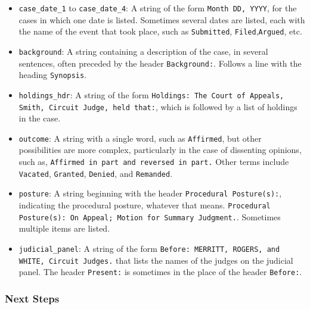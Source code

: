 \documentclass[11pt]{paper}
\begin{document}
\begin{itemize}
	\item \texttt{case\_date\_1} to \texttt{case\_date\_4}: A string of the form 
		\texttt{Month DD, YYYY}, for the cases in which one date is listed. 
		Sometimes several dates are listed, 
		each with the name of the event that took place, 
		such as \texttt{Submitted}, \texttt{Filed},\texttt{Argued}, etc. 

	\item \texttt{background}: A string containing a description of the case, 
		in several sentences, 
		often preceded by the header \texttt{Background:}. 
		Follows a line with the heading \texttt{Synopsis}. 

	\item \texttt{holdings\_hdr}: A string of the form 
		\texttt{Holdings: The Court of Appeals, Smith, Circuit Judge, held that:},
		which is followed by a list of holdings in the case. 

	\item \texttt{outcome}: A string with a single word, 
		such as \texttt{Affirmed}, 
		but other possibilities are more complex, 
		particularly in the case of dissenting opinions, 
		such as, \texttt{Affirmed in part and reversed in part.}
		Other terms include \texttt{Vacated}, \texttt{Granted}, 
		\texttt{Denied}, and \texttt{Remanded}. 

	\item \texttt{posture}: A string beginning with the header 
		\texttt{Procedural Posture(s):}, indicating the procedural posture, 
		whatever that means. 
		\texttt{Procedural Posture(s): On Appeal; Motion for Summary Judgment.}. 
		Sometimes multiple items are listed. 

	\item \texttt{judicial\_panel}: A string of the form 
		\texttt{Before: MERRITT, ROGERS, and WHITE, Circuit Judges.} 
		that lists the names of the judges on the judicial panel. 
		The header \texttt{Present:} is sometimes in the place of 
		the header \texttt{Before:}.  
		

\end{itemize}

\subsubsection*{Next Steps}
\end{document}
